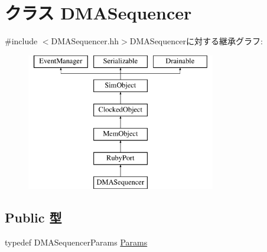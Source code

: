 \hypertarget{classDMASequencer}{
\section{クラス DMASequencer}
\label{classDMASequencer}
}


{\ttfamily \#include $<$DMASequencer.hh$>$}DMASequencerに対する継承グラフ:\begin{figure}[H]
\begin{center}
\leavevmode
\includegraphics[height=6cm]{classDMASequencer}
\end{center}
\end{figure}
\subsection*{Public 型}
\begin{DoxyCompactItemize}
\item 
typedef DMASequencerParams \hyperlink{classDMASequencer_a9827bc75ea7fc70f8a78d2545226f251}{Params}
\end{DoxyCompactItemize}
